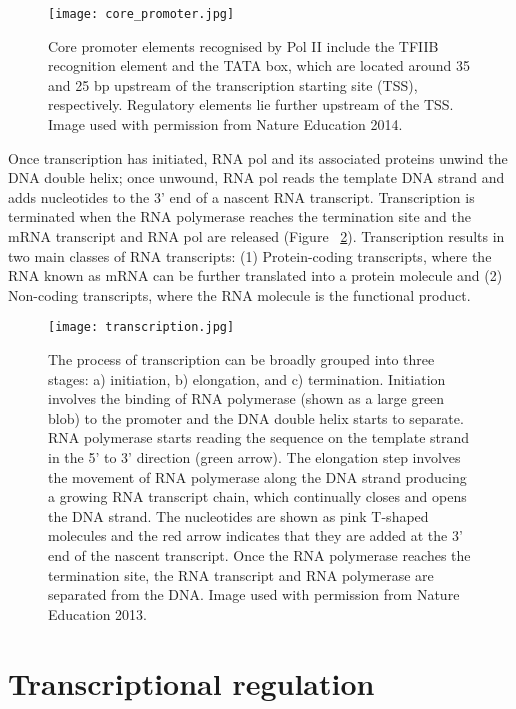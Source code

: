 \begin{figure}[!ht]
   \centering
   \texttt{[image: core\_promoter.jpg]}
   \caption[Core promoter elements]{Core promoter elements recognised by Pol II include the TFIIB recognition element and the TATA box, which are located around 35 and 25 bp upstream of the transcription starting site (TSS), respectively. Regulatory elements lie further upstream of the TSS. Image used with permission from Nature Education 2014.}
   \label{fig:core_promoter}
\end{figure}

Once transcription has initiated, RNA pol and its associated proteins unwind the DNA double helix; once unwound, RNA pol reads the template DNA strand and adds nucleotides to the 3' end of a nascent RNA transcript. Transcription is terminated when the RNA polymerase reaches the termination site and the mRNA transcript and RNA pol are released (Figure ~\ref{fig:transcription}). Transcription results in two main classes of RNA transcripts: (1) Protein-coding transcripts, where the RNA known as mRNA can be further translated into a protein molecule and (2) Non-coding transcripts, where the RNA molecule is the functional product.

\begin{figure}[!ht]
   \centering
   \texttt{[image: transcription.jpg]}
   \caption[DNA transcription]{The process of transcription can be broadly grouped into three stages: a) initiation, b) elongation, and c) termination. Initiation involves the binding of RNA polymerase (shown as a large green blob) to the promoter and the DNA double helix starts to separate. RNA polymerase starts reading the sequence on the template strand in the 5' to 3' direction (green arrow). The elongation step involves the movement of RNA polymerase along the DNA strand producing a growing RNA transcript chain, which continually closes and opens the DNA strand. The nucleotides are shown as pink T-shaped molecules and the red arrow indicates that they are added at the 3' end of the nascent transcript. Once the RNA polymerase reaches the termination site, the RNA transcript and RNA polymerase are separated from the DNA. Image used with permission from Nature Education 2013.}
   \label{fig:transcription}
\end{figure}

\section{Transcriptional regulation}

